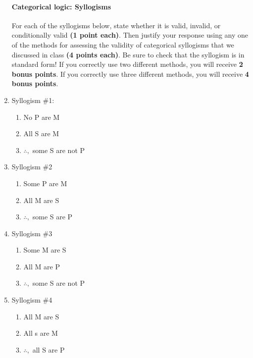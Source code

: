 \documentclass[10pt]{article}
\begin{document}
\begin{enumerate}
   \vspace{3cm}
  

\newpage

\paragraph{Categorical logic: Syllogisms}

For each of the syllogisms below, state whether it is valid, invalid, or conditionally valid \textbf{(1 point each)}. Then justify your response using any one of the methods for assessing the validity of categorical syllogisms that we discussed in class \textbf{(4 points each)}. Be sure to check that the syllogism is in standard form! If you correctly use two different methods, you will receive \textbf{2 bonus points}.  If you correctly use three different methods, you will receive \textbf{4 bonus points}.


  \item Syllogism \#1:
    \begin{enumerate}[1)]
     \item No P are M
     \item All S are M
     \item $\therefore,$ some S are not P
    \end{enumerate}
    
    \vspace{1.5cm}

  \item Syllogism \#2
    \begin{enumerate}[1)]
     \item Some P are M
     \item All M are S
     \item $\therefore,$ some S are P
    \end{enumerate}
    
    \vspace{1.5cm}

    \item Syllogism \#3
        \begin{enumerate}[1)]
     \item Some M are S
     \item All M are P
     \item $\therefore,$ some S are not P
    \end{enumerate}
    
    \vspace{1.5cm}
    
    \item Syllogism \#4
            \begin{enumerate}[1)]
     \item All M are S
     \item All s are M
     \item $\therefore,$ all S are P
    \end{enumerate}
  
\end{enumerate}
\end{document}
